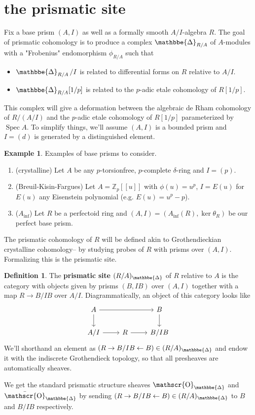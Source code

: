 \documentclass[12pt]{amsproc}
\theoremstyle{definition}
\newtheorem*{definition}{Definition}
\newtheorem*{example}{Example}
\newcommand{\Z}{\mathbb{Z}}
\newcommand{\ra}{\rightarrow}
\DeclareMathOperator{\Spec}{Spec}
\DeclareMathOperator{\prism}{\mathbbe{\Delta}}
\DeclareMathOperator{\Oh}{\mathscr{O}}
\begin{document}

\section{the prismatic site}
Fix a base prism $(A,I)$ as well as a formally smooth $A/I$-algebra $R$. The goal of prismatic cohomology is to produce a complex $\prism_{R/A}$ of $A$-modules with a "Frobenius" endomorphism $\phi_{R/A}$ such that
\begin{itemize}
\item $\prism_{R/A}/I$ is related to differential forms on $R$ relative to $A/I$.
\item $\prism_{R/A}[1/p]$ is related to the $p$-adic etale cohomology of $R[1/p]$.
\end{itemize}

This complex will give a deformation between the algebraic de Rham cohomology of $R/(A/I)$ and the $p$-adic etale cohomology of $R[1/p]$ parameterized by $\Spec A$. To simplify things, we'll assume $(A,I)$ is a bounded prism and $I=(d)$ is generated by a distinguished element.

\begin{example}
Examples of base prisms to consider.

\begin{enumerate}
\item (crystalline) Let $A$ be any $p$-torsionfree, $p$-complete $\delta$-ring and $I=(p)$.
\item (Breuil-Kisin-Fargues) Let $A=\Z_p[[u]]$ with $\phi(u)=u^p$, $I=E(u)$ for $E(u)$ any Eisenstein polynomial (e.g. $E(u)=u^p-p$).
\item ($A_{\text{inf}}$) Let $R$ be a perfectoid ring and $(A,I)=(A_\text{inf}(R), \ker{\theta_R})$ be our perfect base prism.
\end{enumerate}
\end{example}

The prismatic cohomology of $R$ will be defined akin to Grothendieckian crystalline cohomology-- by studying probes of $R$ with prisms over $(A,I)$. Formalizing this is the prismatic site.

\begin{definition} The \textbf{prismatic site} $(R/A)_{\prism}$ of $R$ relative to $A$ is the category with objects given by prisms $(B,IB)$ over $(A,I)$ together with a map $R\ra B/IB$ over $A/I$. Diagrammatically, an object of this category looks like
\[\begin{tikzcd}
A\arrow[rr]\arrow[d]&&B\arrow[d]\\
A/I\arrow[r]&R\arrow[r]&B/IB
\end{tikzcd}\]
We'll shorthand an element as $(R\ra B/IB\leftarrow B)\in (R/A)_{\prism}$ and endow it with the indiscrete Grothendieck topology, so that all presheaves are automatically sheaves.

We get the standard prismatic structure sheaves $\Oh_{\prism}$ and $\bar{\Oh}_{\prism}$ by sending $(R\ra B/IB\leftarrow B)\in (R/A)_{\prism}$ to $B$ and $B/IB$ respectively.
\end{definition}
\end{document}
